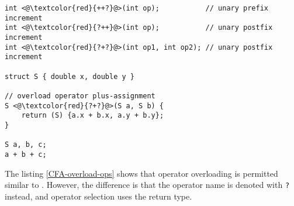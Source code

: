 \begin{lstlisting}[style=C++nokeyword, caption={Overloading operators in \CFA},
label={CFA-overload-ops}]
int <@\textcolor{red}{++?}@>(int op);           // unary prefix increment
int <@\textcolor{red}{?++}@>(int op);           // unary postfix increment
int <@\textcolor{red}{?+?}@>(int op1, int op2); // unary postfix increment

struct S { double x, double y }

// overload operator plus-assignment
S <@\textcolor{red}{?+?}@>(S a, S b) {
    return (S) {a.x + b.x, a.y + b.y};
}

S a, b, c;
a + b + c;
\end{lstlisting}

The listing \ref{CFA-overload-ops} shows that operator overloading is permitted
similar to \CC. However, the difference is that the operator name is
denoted with \verb|?| instead, and operator selection uses the return type.
